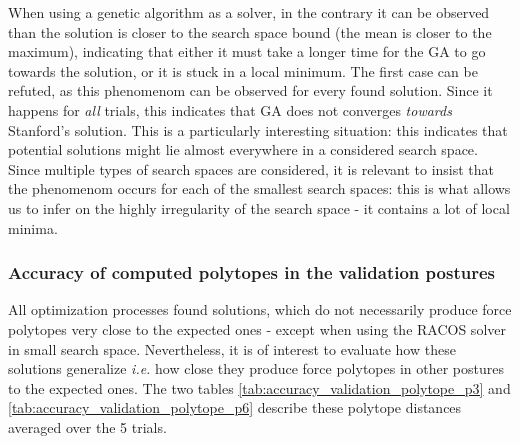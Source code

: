 When using a genetic algorithm as a solver, in the contrary it can be observed than the solution is closer to the search space bound (the mean is closer to the maximum), indicating that either it must take a longer time for the GA to go towards the solution, or it is stuck in a local minimum. The first case can be refuted, as this phenomenom can be observed for every found solution. Since it happens for \emph{all} trials, this indicates that GA does not converges \emph{towards} Stanford's solution. This is a particularly interesting situation: this indicates that potential solutions might lie almost everywhere in a considered search space. Since multiple types of search spaces are considered, it is relevant to insist that the phenomenom occurs for each of the smallest search spaces: this is what allows us to infer on the highly irregularity of the search space - it contains a lot of local minima. 


\subsubsection*{Accuracy of computed polytopes in the validation postures}
All optimization processes found solutions, which do not necessarily produce force polytopes very close to the expected ones - except when using the RACOS solver in small search space. Nevertheless, it is of interest to evaluate how these solutions generalize \emph{i.e.} how close they produce force polytopes in other postures to the expected ones. The two tables \ref{tab:accuracy_validation_polytope_p3} and \ref{tab:accuracy_validation_polytope_p6} describe these polytope distances averaged over the 5 trials.

